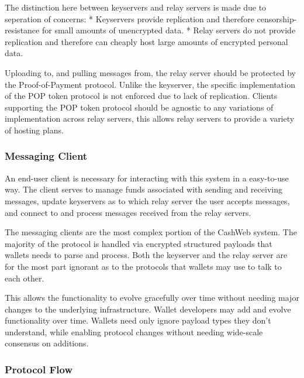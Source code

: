 \documentclass{article}
\begin{document}
The distinction here between keyservers and relay servers is made due to seperation of concerns:
* Keyservers provide replication and therefore censorship-resistance for small amounts of unencrypted data.
* Relay servers do not provide replication and therefore can cheaply host large amounts of encrypted personal data.

Uploading to, and pulling messages from, the relay server should be protected by the Proof-of-Payment protocol. Unlike the keyserver, the specific implementation of the POP token protocol is not enforced due to lack of replication. Clients supporting the POP token protocol should be agnostic to any variations of implementation across relay servers, this allows relay servers to provide a variety of hosting plans.

\subsubsection{Messaging Client}

An end-user client is necessary for interacting with this system in a easy-to-use way. The client serves to manage funds associated with sending and receiving messages, update keyservers as to which relay server the user accepts messages, and connect to and process messages received from the relay servers.

The messaging clients are the most complex portion of the CashWeb system. The majority of the protocol is handled via encrypted structured payloads that wallets needs to parse and process. Both the keyserver and the relay server are for the most part ignorant as to the protocols that wallets may use to talk to each other.

This allows the functionality to evolve gracefully over time without needing major changes to the underlying infrastructure. Wallet developers may add and evolve functionality over time. Wallets need only ignore payload types they don't understand, while enabling protocol changes without needing wide-scale consensus on additions.

\subsubsection{Protocol Flow}

\begin{figure}[H]
\centering
{}
\end{figure}
\end{document}
